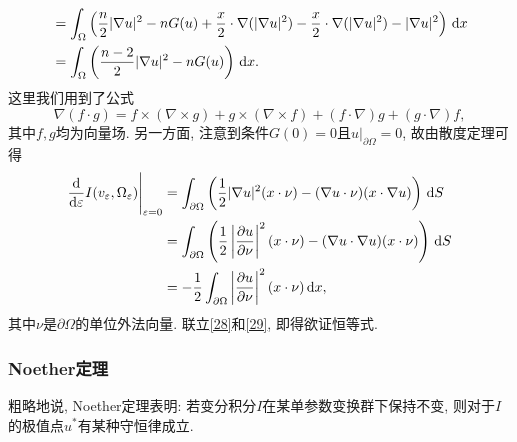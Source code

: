 \begin{example}[Pohozaev恒等式]
\begin{equation}
\begin{aligned}
            &= \int_{\Omega}\left(\frac{n}{2}|\nabla u|^2 - nG(u) + \frac{x}{2} \cdot \nabla (|\nabla u|^2) - \frac{x}{2} \cdot \nabla (|\nabla u|^2) - |\nabla u|^2\right) \,{\rm d}x \\  
            &= \int_{\Omega}\left(\frac{n - 2}{2}|\nabla u|^2 - nG(u)\right) \,{\rm d}x.
        \end{aligned}
    \end{equation}
    这里我们用到了公式
    \begin{equation*}
        \nabla (f \cdot g) = f \times (\nabla \times g) + g \times (\nabla \times f) + (f \cdot \nabla)g + (g \cdot \nabla)f, 
    \end{equation*}
    其中$f, g$均为向量场. 另一方面, 注意到条件$G(0) = 0$且$u|_{\partial\Omega} = 0$, 故由散度定理可得 
    \begin{equation}\label{29}
        \begin{aligned}
            \frac{{\rm d}}{{\rm d}\varepsilon}I(v_{\varepsilon},\Omega_{\varepsilon})\Bigg|_{\varepsilon = 0} &= \int_{\partial\Omega}\left(\frac{1}{2}|\nabla u|^2(x \cdot \nu) - (\nabla u \cdot \nu)(x \cdot \nabla u)\right) \,{\rm d}S \\  
            &= \int_{\partial\Omega}\left(\frac{1}{2}\left|\frac{\partial u}{\partial\nu}\right|^2(x \cdot \nu) - (\nabla u \cdot \nabla u)(x \cdot \nu)\right) \,{\rm d}S \\ 
            &= -\frac{1}{2}\int_{\partial\Omega}\left|\frac{\partial u}{\partial\nu}\right|^2(x \cdot \nu) \,{\rm d}x,
        \end{aligned}
    \end{equation}
    其中$\nu$是$\partial\Omega$的单位外法向量. 联立\eqref{28}和\eqref{29}, 即得欲证恒等式.
\end{example}

\subsubsection{Noether定理}

粗略地说, Noether定理表明: 若变分积分$I$在某单参数变换群下保持不变, 则对于$I$的极值点$u^*$有某种守恒律成立.

